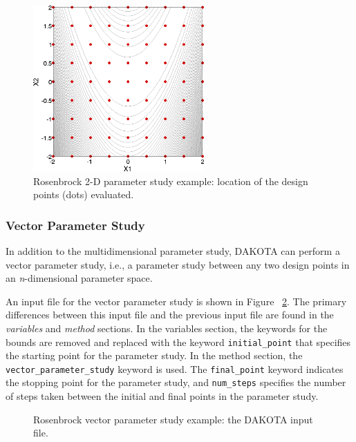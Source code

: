 \begin{figure}[htb!]
  \centering
  \includegraphics[height=2.5in]{images/rosen_2d_pts}
  \caption{Rosenbrock 2-D parameter study example:
  location of the design points (dots) evaluated.}
  \label{tutorial:rosenbrock_2d_graphics}
\end{figure}

\subsubsection{Vector Parameter Study}\label{tutorial:example:param_study:vector}

In addition to the multidimensional parameter study, DAKOTA can
perform a vector parameter study, i.e., a parameter study between any
two design points in an \emph{n}-dimensional parameter space.

An input file for the vector parameter study is shown in Figure~
\ref{tutorial:rosenbrock_vector}.  The primary differences
between this input file and the previous input file are found in the
\emph{variables} and \emph{method} sections. In the variables section,
the keywords for the bounds are removed and replaced with the keyword
\texttt{initial\_point} that specifies the starting point for the
parameter study. In the method section, the
\texttt{vector\_parameter\_study} keyword is used. The
\texttt{final\_point} keyword indicates the stopping point for the
parameter study, and \texttt{num\_steps} specifies the number of steps
taken between the initial and final points in the parameter study.

\begin{figure}[ht!]
  \centering
  \begin{bigbox}
    \begin{small}
    \end{small}
  \end{bigbox}
  \caption{Rosenbrock vector parameter study example: the DAKOTA input
  file.}
  \label{tutorial:rosenbrock_vector}
\end{figure}


